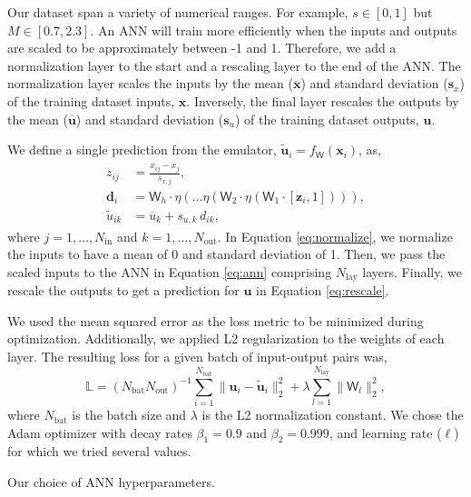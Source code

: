 \documentclass[fleqn,usenatbib]{mnras}
\renewcommand*{\vec}[1]{\boldsymbol{#1}}
\newcommand*{\mat}[1]{\boldsymbol{\mathsf{#1}}}
\newcommand{\inputs}{{x}}
\newcommand{\outputs}{{u}}
\newcommand{\pred}{{\tilde{\outputs}}}
\begin{document}
Our dataset span a variety of numerical ranges. For example, \(s \in [0, 1]\) but \(M \in [0.7, 2.3]\). An ANN will train more efficiently when the inputs and outputs are scaled to be approximately between -1 and 1. Therefore, we add a normalization layer to the start and a rescaling layer to the end of the ANN. The normalization layer scales the inputs by the mean (\(\overline{\vec\inputs}\)) and standard deviation (\(\vec s_{\inputs}\)) of the training dataset inputs, \(\vec\inputs\). Inversely, the final layer rescales the outputs by the mean  (\(\overline{\vec\outputs}\)) and standard deviation (\(\vec s_{\outputs}\)) of the training dataset outputs, \(\vec\outputs\).

We define a single prediction from the emulator, \(\vec\pred_i = f_{\mat W}(\vec\inputs_i)\), as,
%
\begin{align}
    z_{ij} &= \frac{\inputs_{ij} - \overline{\inputs}_j}{s_{\inputs,j}}, \label{eq:normalize}\\
    \vec d_i &= \mat W_h \cdot \eta ( \dots \eta ( \mat W_2 \cdot \eta ( \mat W_1 \cdot
        [\vec z_i, 1]
    ) ) ), \label{eq:ann}\\
    \pred_{ik} &= \overline{\outputs}_k + s_{\outputs,k} \, d_{ik}, \label{eq:rescale}
\end{align}
%
where \(j = 1, \dots, N_\mathrm{in}\) and \(k = 1, \dots, N_\mathrm{out}\). In Equation \ref{eq:normalize}, we normalize the inputs to have a mean of 0 and standard deviation of 1. Then, we pass the scaled inputs to the ANN in Equation \ref{eq:ann} comprising \(N_\mathrm{lay}\) layers. Finally, we rescale the outputs to get a prediction for \(\vec\outputs\) in Equation \ref{eq:rescale}.

We used the mean squared error as the loss metric to be minimized during optimization. Additionally, we applied L2 regularization to the weights of each layer. The resulting loss for a given batch of input-output pairs was,
%
\begin{equation}
    \mathbb{L} = (N_\mathrm{bat}N_\mathrm{out})^{-1} \sum_{i=1}^{N_\mathrm{bat}} \| \vec\outputs_i - \vec\pred_i \|_2^2 + \lambda \sum_{l=1}^{N_\mathrm{lay}} \| \mat W_l \|_2^2,
\end{equation} 
%
where \(N_\mathrm{bat}\) is the batch size and \(\lambda\) is the L2 normalization constant. We chose the Adam optimizer \citep{Kingma.Ba2014} with decay rates \(\beta_1=0.9\) and \(\beta_2 = 0.999\), and learning rate (\(\ell\)) for which we tried several values.

\begin{table}
    \centering
    \caption{Our choice of ANN hyperparameters.}
    
\end{table}
\end{document}
